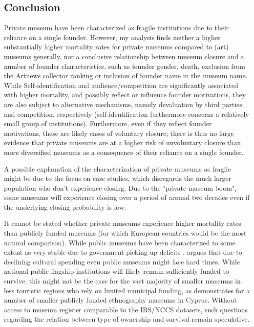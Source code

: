 \documentclass[12pt]{article}
\begin{document}
\subsection*{Conclusion}

Private museum have been characterized as fragile institutions due to their reliance on a single founder.
However, my analysis finds neither a higher substantially higher mortality rates for private museums compared to (art) museums generally, nor a conclusive relationship between museum closure and a number of founder characteristics, such as founder gender, death, exclusion from the Artnews collector ranking or inclusion of founder name in the museum name.
While Self-identification and audience/competition are significantly associated with higher mortality, and possibly reflect or influence founder motivations, they are also subject to alternative mechanisms, namely devaluation by third parties and competition, respectively (self-identification furthermore concerns a relatively small group of institutions).
Furthermore, even if they reflect founder motivations, these are likely cases of voluntary closure; there is thus no large evidence that private museums are at a higher risk of unvoluntary closure than more diversified museums as a consequence of their reliance on a single founder. 



A possible explanation of the characterization of private museums as fragile might be due to the focus on case studies, which disregards the much larger population who don't experience closing.
Due to the "private museum boom", some museums will experience closing over a period of around two decades even if the underlying closing probability is low.





It cannot be stated whether private museums experience higher mortality rates than publicly funded museums (for which European countries would be the most natural comparison).
While public museums have been characterized to some extent as very stable due to government picking up deficits \parencite{Meier_Frey_2003_faces,Bechtler_Imhof_2018_future}, \textcite{Walker_2019_collector} argues that due to declining cultural spending even public museums might face hard times.
While national public flagship institutions will likely remain sufficiently funded to survive, this might not be the case for the vast majority of smaller museums in less touristic regions who rely on limited municipal funding, as \textcite{StylianouLambert_etal_2014_museums} demonstrates for a number of smaller publicly funded ethnography museums in Cyprus.
Without access to museum register comparable to the IRS/NCCS datasets, such questions regarding the relation between type of ownership and survival remain speculative.
\end{document}
